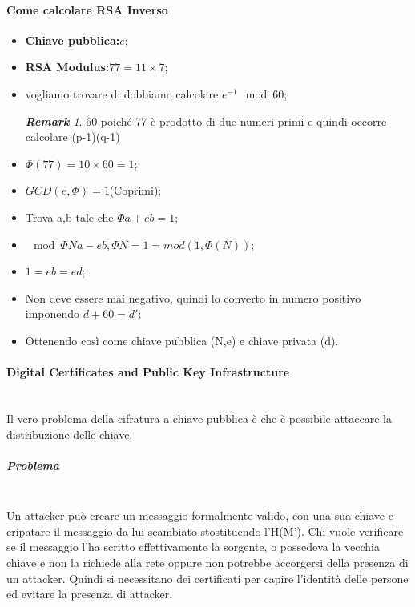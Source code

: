 \documentclass{article}
\theoremstyle{remark}
\newtheorem*{remark}{\textbf{Remark}}
\begin{document}
\paragraph{Come calcolare RSA Inverso}
\begin{itemize}
	\item \textbf{Chiave pubblica:}\(e\);
	\item \textbf{RSA Modulus:}\(77=11\times 7\);
	\item vogliamo trovare d: dobbiamo calcolare \(e^{-1}\mod{60}\);
	\begin{remark}
		\(60\) poiché 77 è prodotto di due numeri primi e quindi occorre calcolare (p-1)(q-1)
	\end{remark}
	\item \(\Phi(77)=10\times 60=1\);
	\item \(GCD(e,\Phi)=1\)(Coprimi);
	\item Trova a,b tale che \(\Phi a+e b = 1\);
	\item \(\mod{\Phi{N}a-eb,\Phi{N}}=1= mod(1,\Phi(N))\);
	\item \(1=eb=ed\);
	\item Non deve essere mai negativo, quindi lo converto in numero positivo imponendo \(d+60=d'\);
	\item Ottenendo così come chiave pubblica (N,e) e chiave privata (d).
\end{itemize}
\paragraph{Digital Certificates and Public Key Infrastructure}\mbox{}\\
Il vero problema della cifratura a chiave pubblica è che è possibile attaccare la distribuzione delle chiave.
\subparagraph{Problema}\mbox{}\\
Un attacker può creare un messaggio formalmente valido, con una sua chiave e cripatare il messaggio da lui scambiato stostituendo l'H(M'). Chi vuole verificare se il messaggio l'ha scritto effettivamente la sorgente, o possedeva la vecchia chiave e non la richiede alla rete oppure non potrebbe accorgersi della presenza di un attacker. Quindi si necessitano dei certificati per capire l'identità delle persone ed evitare la presenza di attacker.
\end{document}
